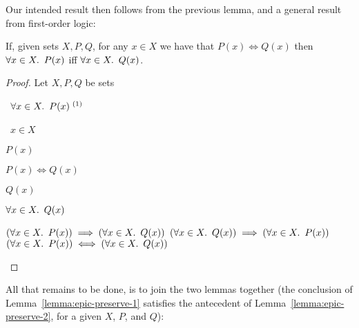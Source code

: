 Our intended result then follows from the previous lemma, and a general result from first-order logic:

\begin{lemma}\label{lemma:epic-preserve-2}
  If, given sets $X, P, Q$, for any $x\in X$ we have that ${P(x) \iff Q(x)}$ then $\forall x\in X\ldotp~P(x)$ iff $\forall x\in X\ldotp~Q(x)$.

  \begin{proof}
    Let $X, P, Q$ be sets
    \begin{itemize}
      \step
        \begin{itemize}
          \subp{\star}
            \Ass~$\forall x\in X\ldotp~P(x)^{\text~(1)}$
            \marginnote{\Hyp}

          \step
            \begin{itemize}
              \subp{\dagger}
                \Let~$x\in X$
                \marginnote{\Hyp}

              \step
                $P(x)$

              \step
                $P(x)\iff Q(x)$

              \step[\imps]
                $Q(x)$
                \marginnote{$\iffs$-\Elim}
            \end{itemize}

            \step[\imps]
              $\forall x\in X\ldotp~Q(x)$
              \marginnote{$\forall$-\Intro}
        \end{itemize}

      \step[\imps]
        $(\forall x\in X\ldotp~P(x))\implies(\forall x\in X\ldotp~Q(x))$
        \marginnote{$\imps$-\Intro}
      \step[\phantom{\imps}]
        $(\forall x\in X\ldotp~Q(x))\implies(\forall x\in X\ldotp~P(x))$
      \step[\iffs]
        $(\forall x\in X\ldotp~P(x))\iff(\forall x\in X\ldotp~Q(x))$
        \qedhere
        \marginnote{$\iffs$-\Intro}
    \end{itemize}
  \end{proof}
\end{lemma}

All that remains to be done, is to join the two lemmas together (the conclusion of Lemma~\ref{lemma:epic-preserve-1} satisfies the antecedent of Lemma~\ref{lemma:epic-preserve-2}, for a given $X$, $P$, and $Q$):

